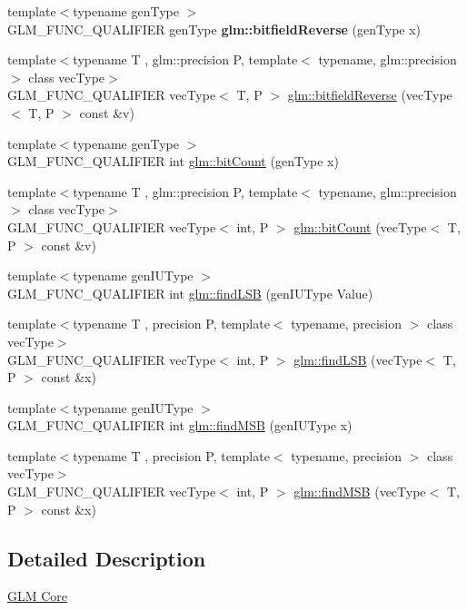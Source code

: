 \begin{DoxyCompactItemize}
\item 
\mbox{\label{func__integer_8inl_abaf011115ec2807a589806911d97c10e}} 
{\footnotesize template$<$typename gen\+Type $>$ }\\G\+L\+M\+\_\+\+F\+U\+N\+C\+\_\+\+Q\+U\+A\+L\+I\+F\+I\+ER gen\+Type {\bfseries glm\+::bitfield\+Reverse} (gen\+Type x)
\item 
{\footnotesize template$<$typename T , glm\+::precision P, template$<$ typename, glm\+::precision $>$ class vec\+Type$>$ }\\G\+L\+M\+\_\+\+F\+U\+N\+C\+\_\+\+Q\+U\+A\+L\+I\+F\+I\+ER vec\+Type$<$ T, P $>$ \hyperlink{group__core__func__integer_ga153e7e8d0c035f83cce50fc3e580930f}{glm\+::bitfield\+Reverse} (vec\+Type$<$ T, P $>$ const \&v)
\item 
{\footnotesize template$<$typename gen\+Type $>$ }\\G\+L\+M\+\_\+\+F\+U\+N\+C\+\_\+\+Q\+U\+A\+L\+I\+F\+I\+ER int \hyperlink{group__core__func__integer_ga44abfe3379e11cbd29425a843420d0d6}{glm\+::bit\+Count} (gen\+Type x)
\item 
{\footnotesize template$<$typename T , glm\+::precision P, template$<$ typename, glm\+::precision $>$ class vec\+Type$>$ }\\G\+L\+M\+\_\+\+F\+U\+N\+C\+\_\+\+Q\+U\+A\+L\+I\+F\+I\+ER vec\+Type$<$ int, P $>$ \hyperlink{group__core__func__integer_ga1f29640969a3c54564da06ac67a5392e}{glm\+::bit\+Count} (vec\+Type$<$ T, P $>$ const \&v)
\item 
{\footnotesize template$<$typename gen\+I\+U\+Type $>$ }\\G\+L\+M\+\_\+\+F\+U\+N\+C\+\_\+\+Q\+U\+A\+L\+I\+F\+I\+ER int \hyperlink{group__core__func__integer_gaf74c4d969fa34ab8acb9d390f5ca5274}{glm\+::find\+L\+SB} (gen\+I\+U\+Type Value)
\item 
{\footnotesize template$<$typename T , precision P, template$<$ typename, precision $>$ class vec\+Type$>$ }\\G\+L\+M\+\_\+\+F\+U\+N\+C\+\_\+\+Q\+U\+A\+L\+I\+F\+I\+ER vec\+Type$<$ int, P $>$ \hyperlink{group__core__func__integer_ga014a72009e68233c34c06a6dc2251b8c}{glm\+::find\+L\+SB} (vec\+Type$<$ T, P $>$ const \&x)
\item 
{\footnotesize template$<$typename gen\+I\+U\+Type $>$ }\\G\+L\+M\+\_\+\+F\+U\+N\+C\+\_\+\+Q\+U\+A\+L\+I\+F\+I\+ER int \hyperlink{group__core__func__integer_ga7e4a794d766861c70bc961630f8ef621}{glm\+::find\+M\+SB} (gen\+I\+U\+Type x)
\item 
{\footnotesize template$<$typename T , precision P, template$<$ typename, precision $>$ class vec\+Type$>$ }\\G\+L\+M\+\_\+\+F\+U\+N\+C\+\_\+\+Q\+U\+A\+L\+I\+F\+I\+ER vec\+Type$<$ int, P $>$ \hyperlink{group__core__func__integer_ga433104d77ec2ba58888aaefb77e9183f}{glm\+::find\+M\+SB} (vec\+Type$<$ T, P $>$ const \&x)
\end{DoxyCompactItemize}


\subsection{Detailed Description}
\hyperlink{group__core}{G\+LM Core} 